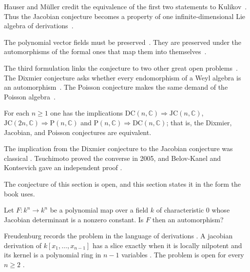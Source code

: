 Hauser and Müller credit the equivalence of the first two statements to
Kulikov~\cite[p.~211]{HauserMuller1998}. Thus the Jacobian conjecture becomes
a property of one infinite-dimensional Lie algebra of
derivations~\cite[Proposition~1, p.~211]{HauserMuller1998}.

The polynomial vector fields must be
preserved~\cite[Proposition~1, p.~211]{HauserMuller1998}. They are preserved
under the automorphisms of the formal ones that map them into
themselves~\cite[Proposition~1, p.~211]{HauserMuller1998}.

The third formulation links the conjecture to two other great open
problems~\cite[Theorem~4.4.1, p.~91]{VanEssenKurodaKoenig2021}. The Dixmier
conjecture asks whether every endomorphism of a Weyl algebra is an
automorphism~\cite[Theorem~4.4.1, p.~91]{VanEssenKurodaKoenig2021}. The
Poisson conjecture makes the same demand of the Poisson
algebra~\cite[Theorem~4.4.1, p.~91]{VanEssenKurodaKoenig2021}.

\begin{theorem}\label{thm:comm:dc-jc-p}
For each $n \ge 1$ one has the implications
$\mathrm{DC}(n,\mathbb{C}) \Rightarrow \mathrm{JC}(n,\mathbb{C})$,
$\mathrm{JC}(2n,\mathbb{C}) \Rightarrow \mathrm{P}(n,\mathbb{C})$ and
$\mathrm{P}(n,\mathbb{C}) \Rightarrow \mathrm{DC}(n,\mathbb{C})$; that is,
the Dixmier, Jacobian, and Poisson conjectures are equivalent.
\end{theorem}

The implication from the Dixmier conjecture to the Jacobian conjecture was
classical \cite[p.~91]{VanEssenKurodaKoenig2021}. Tsuchimoto proved the
converse in 2005, and Belov-Kanel and Kontsevich gave an independent proof
\cite[p.~91]{VanEssenKurodaKoenig2021}.

The conjecture of this section is open, and this section states it in the form
the book uses.

\begin{problem}\label{prob:open:jc}
Let $F\colon k^n\to k^n$ be a polynomial map over a field $k$ of characteristic
$0$ whose Jacobian determinant is a nonzero constant.
Is $F$ then an automorphism?
\end{problem}

Freudenburg records the problem in the language of derivations
\cite[p.~81]{Freudenburg2017}. A jacobian derivation of $k[x_1,\dots,x_{n-1}]$
has a slice exactly when it is locally nilpotent and its kernel is a
polynomial ring in $n-1$ variables \cite[p.~81]{Freudenburg2017}. The problem
is open for every $n\ge2$ \cite[pp.~1--2]{BelovKanelKontsevich2007}.

